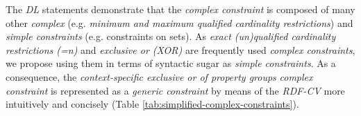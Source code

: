 \documentclass[a4paper,fontsize=11pt]{scrartcl}
\begin{document}

The \emph{DL} statements demonstrate that the \emph{complex constraint} 
is composed of many other \emph{complex} (e.g. \emph{minimum and maximum qualified cardinality restrictions}) and \emph{simple constraints} (e.g. constraints on sets).
As \emph{exact (un)qualified cardinality restrictions (=n)} and \emph{exclusive or (XOR)} are frequently used \emph{complex constraints},
we propose using them in terms of syntactic sugar as \emph{simple constraints}.
As a consequence, the \emph{context-specific exclusive or of property groups} \emph{complex constraint} is represented as a \emph{generic constraint} by means of the \emph{RDF-CV} more intuitively and concisely (Table \ref{tab:simplified-complex-constraints}).
\end{document}
